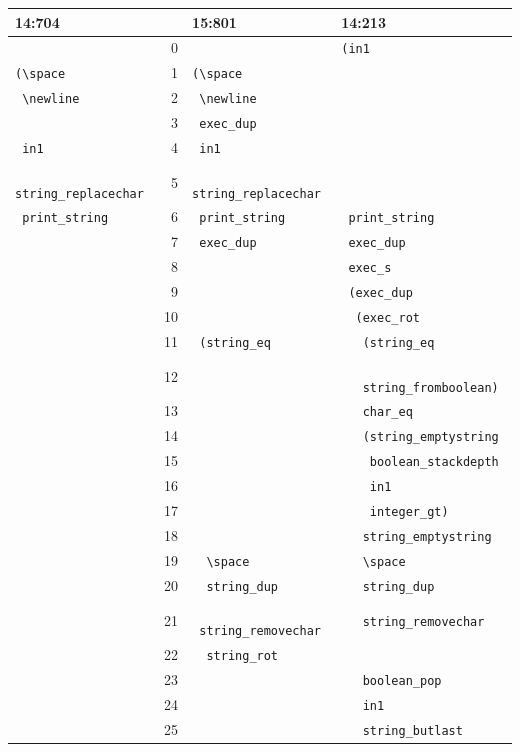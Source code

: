 \documentclass[graybox]{svmult}
\begin{document}
\begin{table}
	\begin{tabular}{l|rl|l}
		\textbf{14:704} & & \textbf{15:801} & \textbf{14:213} \\
		\hline
		& 0 & & \texttt{(in1} \\ 
		\texttt{(\textbackslash space} & 1 & \texttt{(\textbackslash space} & \\ 
		\texttt{ \textbackslash newline} & 2 & \texttt{ \textbackslash newline} &  \\ 
		& 3 & \texttt{ exec\_dup} &  \\ 
		\texttt{ in1} & 4 & \texttt{ in1} &  \\ 
		\texttt{ string\_replacechar} & 5 & \texttt{ string\_replacechar} &  \\ 
		\texttt{ print\_string} & 6 & \texttt{ print\_string} & \texttt{ print\_string} \\ 
		& 7 & \texttt{ exec\_dup} & \texttt{ exec\_dup} \\ 
		& 8 &  & \texttt{ exec\_s} \\ 
		& 9 &  & \texttt{ (exec\_dup} \\ 
		& 10 &  & \texttt{ \ (exec\_rot} \\ 
		& 11 & \texttt{ (string\_eq} & \texttt{ \ \ (string\_eq} \\
		& 12 & &  \texttt{ \ \ \ string\_fromboolean)} \\ 
		& 13 &  & \texttt{ \ \ char\_eq} \\ 
		& 14 & & \texttt{ \ \ (string\_emptystring} \\
		& 15 & &  \texttt{ \ \ \ boolean\_stackdepth} \\
		& 16 & & \texttt{ \ \ \ in1} \\
		& 17 & & \texttt{ \ \ \ integer\_gt)} \\ 
		& 18 &  & \texttt{ \ \ string\_emptystring} \\ 
		& 19 & \texttt{ \ \textbackslash space} & \texttt{ \ \ \textbackslash space} \\ 
		& 20 & \texttt{ \ string\_dup} & \texttt{ \ \ string\_dup} \\ 
		& 21 & \texttt{ \ string\_removechar} & \texttt{ \ \ string\_removechar} \\
		& 22 & \texttt{ \ string\_rot} & \\
		& 23 & & \texttt{ \ \ boolean\_pop} \\ 
		& 24 &   & \texttt{ \ \ in1} \\ 
		& 25 &   & \texttt{ \ \ string\_butlast} \\ 

\end{tabular}
\end{table}
\end{document}

